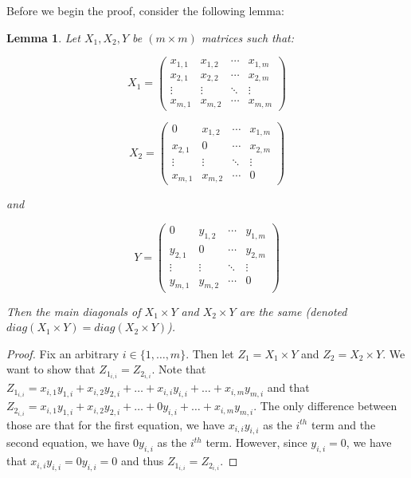 \documentclass{article} %
\theoremstyle{style1}
\newtheorem{lemma}[theorem]{Lemma}
\theoremstyle{example}
\begin{document}
\GARP*

Before we begin the proof, consider the following lemma:

\begin{lemma}
\label{lma:LemmaA}
Let $X_1, X_2, Y$ be $(m\times m)$ matrices such that:

\begin{minipage}{.5\linewidth}
\[
X_1 =
 \begin{pmatrix}
  x_{1,1} & x_{1,2} & \cdots & x_{1,m} \\
  x_{2,1} & x_{2,2} & \cdots & x_{2,m} \\
  \vdots  & \vdots  & \ddots & \vdots  \\
  x_{m,1} & x_{m,2} & \cdots & x_{m,m}
 \end{pmatrix}
\]
\end{minipage}
\begin{minipage}{.5\linewidth}
\[
X_2 =
 \begin{pmatrix}
  0 & x_{1,2} & \cdots & x_{1,m} \\
  x_{2,1} & 0 & \cdots & x_{2,m} \\
  \vdots  & \vdots  & \ddots & \vdots  \\
  x_{m,1} & x_{m,2} & \cdots & 0
 \end{pmatrix}
\]
\end{minipage}
and 

\[
Y =
 \begin{pmatrix}
  0 & y_{1,2} & \cdots & y_{1,m} \\
  y_{2,1} & 0 & \cdots & y_{2,m} \\
  \vdots  & \vdots  & \ddots & \vdots  \\
  y_{m,1} & y_{m,2} & \cdots & 0
 \end{pmatrix}
\]

Then the main diagonals of $X_1\times Y$ and $X_2\times Y$ are the same (denoted $diag(X_1\times Y)=diag(X_2\times Y)$).
\end{lemma}

\begin{proof}
Fix an arbitrary $i\in\{1,\ldots,m\}$. Then let $Z_1=X_1\times Y$ and $Z_2=X_2\times Y$. We want to show that $Z_{1_{i,i}}=Z_{2_{i,i}}$. Note that $Z_{1_{i,i}}=x_{i,1}y_{1,i}+x_{i,2}y_{2,i}+\ldots+x_{i,i}y_{i,i}+\ldots+x_{i,m}y_{m,i}$ and that $Z_{2_{i,i}}=x_{i,1}y_{1,i}+x_{i,2}y_{2,i}+\ldots+0y_{i,i}+\ldots+x_{i,m}y_{m,i}$. The only difference between those are that for the first equation, we have $x_{i,i}y_{i,i}$ as the $i^{th}$ term and the second equation, we have $0y_{i,i}$ as the $i^{th}$ term. However, since $y_{i,i}=0$, we have that $x_{i,i}y_{i,i}=0y_{i,i}=0$ and thus $Z_{1_{i,i}}=Z_{2_{i,i}}$.
\end{proof}
\end{document}
